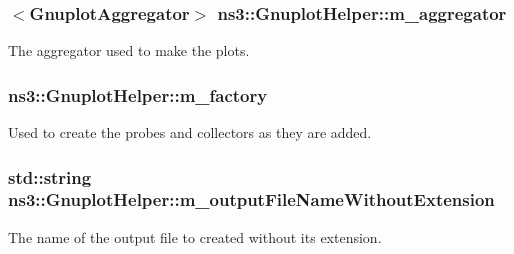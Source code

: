 \subsubsection[{\texorpdfstring{m\+\_\+aggregator}{m_aggregator}}]{$<${\bf Gnuplot\+Aggregator}$>$ ns3\+::\+Gnuplot\+Helper\+::m\+\_\+aggregator\hspace{0.3cm}{\ttfamily [private]}}\hypertarget{classns3_1_1GnuplotHelper_a41e45ec3d599db99d791512e60a10c35}{}\label{classns3_1_1GnuplotHelper_a41e45ec3d599db99d791512e60a10c35}


The aggregator used to make the plots. 

\subsubsection[{\texorpdfstring{m\+\_\+factory}{m_factory}}]{ ns3\+::\+Gnuplot\+Helper\+::m\+\_\+factory\hspace{0.3cm}{\ttfamily [private]}}\hypertarget{classns3_1_1GnuplotHelper_ac04d61e2ed2cd2f3bcc6669114cbbb53}{}\label{classns3_1_1GnuplotHelper_ac04d61e2ed2cd2f3bcc6669114cbbb53}


Used to create the probes and collectors as they are added. 

\subsubsection[{\texorpdfstring{m\+\_\+output\+File\+Name\+Without\+Extension}{m_outputFileNameWithoutExtension}}]{\setlength{\rightskip}{0pt plus 5cm}std\+::string ns3\+::\+Gnuplot\+Helper\+::m\+\_\+output\+File\+Name\+Without\+Extension\hspace{0.3cm}{\ttfamily [private]}}\hypertarget{classns3_1_1GnuplotHelper_ab42930fa6681380e5b28d87326392cb4}{}\label{classns3_1_1GnuplotHelper_ab42930fa6681380e5b28d87326392cb4}


The name of the output file to created without its extension. 

